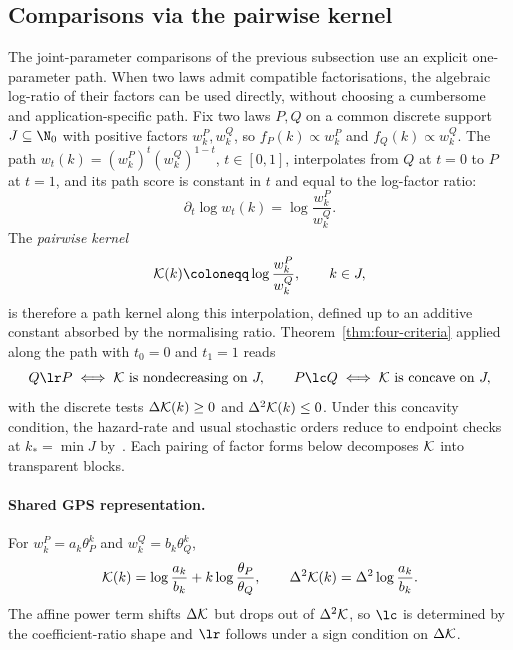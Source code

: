 \documentclass[11pt]{article}
\begin{document}
\subsection{Comparisons via the pairwise kernel}
\label{sec:pairwise-applications}

The joint-parameter comparisons of the previous subsection use an explicit one-parameter path. When two laws admit compatible factorisations, the algebraic log-ratio of their factors can be used directly, without choosing a cumbersome and application-specific path. Fix two laws \(P,Q\) on a common discrete support \(J\subseteq\N_0\) with positive factors \(w^P_k,w^Q_k\), so \(f_P(k)\propto w^P_k\) and \(f_Q(k)\propto w^Q_k\). The path \(w_t(k)=(w^P_k)^t(w^Q_k)^{1-t}\), \(t\in[0,1]\), interpolates from \(Q\) at \(t=0\) to \(P\) at \(t=1\), and its path score is constant in \(t\) and equal to the log-factor ratio:
\[
\partial_t\log w_t(k) =\log\frac{w^P_k}{w^Q_k}.
\]
The \emph{pairwise kernel}
\[
{\cal K}(k)\coloneqq \log\frac{w^P_k}{w^Q_k}, \qquad k\in J,
\]
is therefore a path kernel along this interpolation, defined up to an additive constant absorbed by the normalising ratio. Theorem~\ref{thm:four-criteria} applied along the path with \(t_0=0\) and \(t_1=1\) reads
\[
Q\lr P \iff {\cal K}\text{ is nondecreasing on }J, \qquad P\lc Q \iff {\cal K}\text{ is concave on }J,
\]
with the discrete tests \(\Delta{\cal K}(k)\ge 0\) and \(\Delta^2{\cal K}(k)\le 0\). Under this concavity condition, the hazard-rate and usual stochastic orders reduce to endpoint checks at \(k_*=\min J\) by~\cite{DerbaziPairwise}. Each pairing of factor forms below decomposes \({\cal K}\) into transparent blocks.

\paragraph{Shared GPS representation.}
For \(w^P_k=a_k\theta_P^k\) and \(w^Q_k=b_k\theta_Q^k\),
\[
{\cal K}(k) =\log\frac{a_k}{b_k}+k\log\frac{\theta_P}{\theta_Q}, \qquad \Delta^2{\cal K}(k) =\Delta^2\log\frac{a_k}{b_k}.
\]
The affine power term shifts \(\Delta{\cal K}\) but drops out of \(\Delta^2{\cal K}\), so \(\lc\) is determined by the coefficient-ratio shape and \(\lr\) follows under a sign condition on \(\Delta{\cal K}\).
\end{document}
